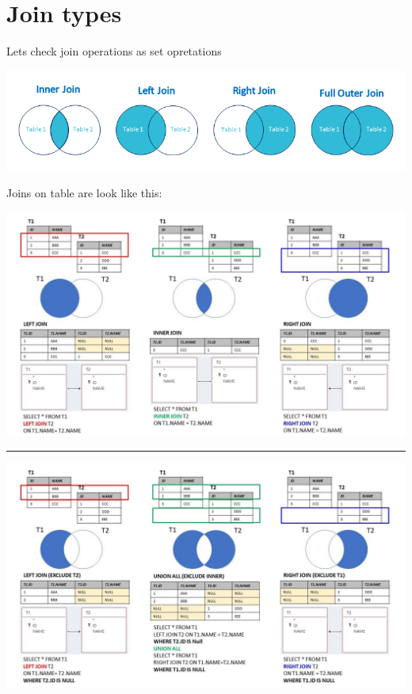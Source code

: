 \documentclass[
  letterpaper,
  DIV=11,
  numbers=noendperiod]{scrreprt}
\begin{document}
\section{Join types}\label{join-types}

Lets check join operations as set opretations

\includegraphics{img/da-dplyr/Joins_Diagram.png}

Joins on table are look like this:

\includegraphics{img/da-dplyr/sqljoin1.jpg}

\begin{center}\rule{0.5\linewidth}{0.5pt}\end{center}

\includegraphics{img/da-dplyr/sqljoin2.jpg}
\end{document}
